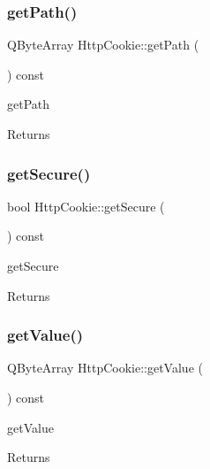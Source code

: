 \subsubsection{\texorpdfstring{get\+Path()}{getPath()}}
{\footnotesize\ttfamily Q\+Byte\+Array Http\+Cookie\+::get\+Path (\begin{DoxyParamCaption}{ }\end{DoxyParamCaption}) const}



get\+Path 

\begin{DoxyReturn}{Returns}

\end{DoxyReturn}
\mbox{\label{class_http_cookie_a270cd78805263b5ed80f4e3354caf4e4}} 
\subsubsection{\texorpdfstring{get\+Secure()}{getSecure()}}
{\footnotesize\ttfamily bool Http\+Cookie\+::get\+Secure (\begin{DoxyParamCaption}{ }\end{DoxyParamCaption}) const}



get\+Secure 

\begin{DoxyReturn}{Returns}

\end{DoxyReturn}
\mbox{\label{class_http_cookie_a04d3cdafe9c7e5f9068816abf33aa4a9}} 
\subsubsection{\texorpdfstring{get\+Value()}{getValue()}}
{\footnotesize\ttfamily Q\+Byte\+Array Http\+Cookie\+::get\+Value (\begin{DoxyParamCaption}{ }\end{DoxyParamCaption}) const}



get\+Value 

\begin{DoxyReturn}{Returns}

\end{DoxyReturn}
\mbox{\label{class_http_cookie_ac390582430915aa5570c6a397f20210d}} 
